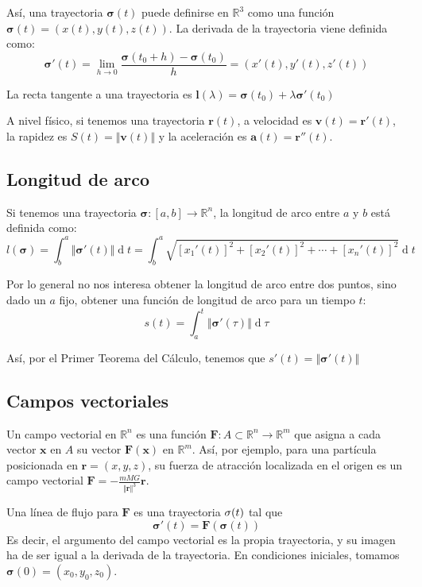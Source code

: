 \documentclass[a4paper]{article}
\renewcommand{\d}[1]{\ensuremath{\operatorname{d}\!{#1}}}
\begin{document}
Así, una trayectoria $\boldsymbol{\sigma}(t)$ puede definirse en $\mathbb{R}^3$ como una función $\boldsymbol{\sigma}(t) = (x(t), y(t), z(t))$. La derivada de la trayectoria viene definida como:
\[ \boldsymbol{\sigma}'(t) = \lim_{h \rightarrow 0}\frac{\boldsymbol{\sigma}(t_0+h)-\boldsymbol{\sigma}(t_0)}{h} = (x'(t), y'(t), z'(t)) \]

La recta tangente a una trayectoria es $\textbf{l}(\lambda) = \boldsymbol{\sigma}(t_0) + \lambda\boldsymbol{\sigma}'(t_0)$

A nivel físico, si tenemos una trayectoria $\textbf{r}(t)$, a velocidad es $\textbf{v}(t)=\textbf{r}'(t)$, la rapidez es $S(t) = \Vert\textbf{v}(t)\Vert$ y la aceleración es $\textbf{a}(t) = \textbf{r}''(t)$.

\subsection{Longitud de arco}
Si tenemos una trayectoria $\boldsymbol{\sigma}:[a,b] \rightarrow \mathbb{R}^n$, la longitud de arco entre $a$ y $b$ está definida como:
\[ l(\boldsymbol{\sigma}) = \int^a_b{\Vert\boldsymbol{\sigma}'(t)\Vert \d t} = \int^a_b{\sqrt{ [x_1'(t)]^2+[x_2'(t)]^2+\cdots+[x_n'(t)]^2 }} \d t \]

Por lo general no nos interesa obtener la longitud de arco entre dos puntos, sino dado un $a$ fijo, obtener una función de longitud de arco para un tiempo $t$:
\[  s(t) = \int_a^t{\Vert\boldsymbol{\sigma}'(\tau)\Vert \d \tau} \]

Así, por el Primer Teorema del Cálculo, tenemos que $s'(t) = \Vert\boldsymbol{\sigma}'(t)\Vert$

\subsection{Campos vectoriales}
Un campo vectorial en $\mathbb{R}^n$ es una función $\textbf{F}: A  \subset \mathbb{R}^n \rightarrow \mathbb{R}^m$ que asigna a cada vector $\textbf{x}$ en $A$ su vector $\textbf{F}(\textbf{x})$ en $\mathbb{R}^m$. Así, por ejemplo, para una partícula posicionada en $\textbf{r}  =(x,y,z)$, su fuerza de atracción localizada en el origen es un campo vectorial $\textbf{F} = - \frac{mMG}{\Vert\textbf{r}\Vert^3}\textbf{r}$.

Una línea de flujo para $\textbf{F}$ es una trayectoria $\boldmath{\sigma}(t)$ tal que 
\[ \boldsymbol{\sigma}'(t) = \textbf{F}(\boldsymbol{\sigma}(t)) \]
Es decir, el argumento del campo vectorial es la propia trayectoria, y su imagen ha de ser igual a la derivada de la trayectoria. En condiciones iniciales, tomamos $\boldsymbol{\sigma}(0) = (x_0, y_0, z_0)$.
\end{document}
